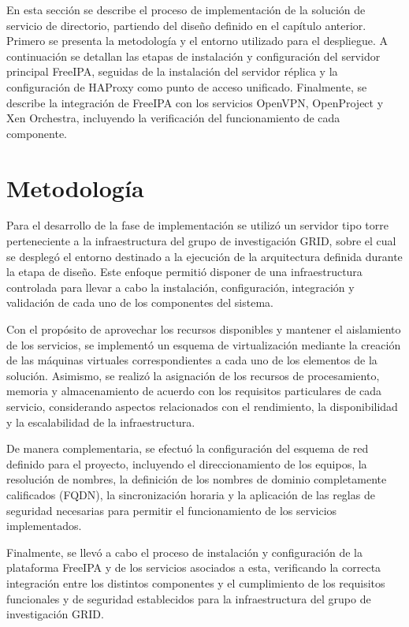 \label{cap:implementacio}
\vspace*{0.7cm}

En esta sección se describe el proceso de implementación de la solución de servicio de directorio, partiendo del diseño definido en el capítulo anterior. Primero se presenta la metodología y el entorno utilizado para el despliegue. A continuación se detallan las etapas de instalación y configuración del servidor principal FreeIPA, seguidas de la instalación del servidor réplica y la configuración de HAProxy como punto de acceso unificado. Finalmente, se describe la integración de FreeIPA con los servicios OpenVPN, OpenProject y Xen Orchestra, incluyendo la verificación del funcionamiento de cada componente.

\section{Metodología}\label{sec:metodologia-implementacio}

Para el desarrollo de la fase de implementación se utilizó un servidor tipo torre perteneciente a la infraestructura del grupo de investigación \ac{GRID}, sobre el cual se desplegó el entorno destinado a la ejecución de la arquitectura definida durante la etapa de diseño. Este enfoque permitió disponer de una infraestructura controlada para llevar a cabo la instalación, configuración, integración y validación de cada uno de los componentes del sistema.

Con el propósito de aprovechar los recursos disponibles y mantener el aislamiento de los servicios, se implementó un esquema de virtualización mediante la creación de las máquinas virtuales correspondientes a cada uno de los elementos de la solución. Asimismo, se realizó la asignación de los recursos de procesamiento, memoria y almacenamiento de acuerdo con los requisitos particulares de cada servicio, considerando aspectos relacionados con el rendimiento, la disponibilidad y la escalabilidad de la infraestructura.

De manera complementaria, se efectuó la configuración del esquema de red definido para el proyecto, incluyendo el direccionamiento de los equipos, la resolución de nombres, la definición de los nombres de dominio completamente calificados (\ac{FQDN}), la sincronización horaria y la aplicación de las reglas de seguridad necesarias para permitir el funcionamiento de los servicios implementados.

Finalmente, se llevó a cabo el proceso de instalación y configuración de la plataforma FreeIPA y de los servicios asociados a esta, verificando la correcta integración entre los distintos componentes y el cumplimiento de los requisitos funcionales y de seguridad establecidos para la infraestructura del grupo de investigación \ac{GRID}.

